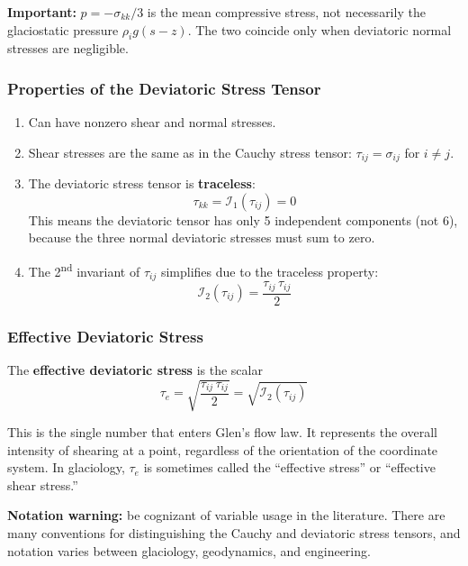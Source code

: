 \documentclass[11pt]{article}
\begin{document}
\textbf{Important:} $p = -\sigma_{kk}/3$ is the mean compressive stress, not necessarily the glaciostatic pressure $\rho_i g (s-z)$.  The two coincide only when deviatoric normal stresses are negligible.

\subsubsection*{Properties of the Deviatoric Stress Tensor}

\begin{enumerate}
  \item Can have nonzero shear and normal stresses.
  \item Shear stresses are the same as in the Cauchy stress tensor: $\tau_{ij} = \sigma_{ij}$ for $i \neq j$.
  \item The deviatoric stress tensor is \textbf{traceless}:
    \begin{equation}
      \tau_{kk} = \mathcal{I}_1(\tau_{ij}) = 0
    \end{equation}
    This means the deviatoric tensor has only 5 independent components (not 6), because the three normal deviatoric stresses must sum to zero.
  \item The 2\textsuperscript{nd} invariant of $\tau_{ij}$ simplifies due to the traceless property:
    \begin{equation}
      \mathcal{I}_2(\tau_{ij}) = \frac{\tau_{ij}\,\tau_{ij}}{2}
    \end{equation}
\end{enumerate}

\subsubsection*{Effective Deviatoric Stress}

The \textbf{effective deviatoric stress} is the scalar
\begin{equation}
  \tau_e = \sqrt{\frac{\tau_{ij}\,\tau_{ij}}{2}} = \sqrt{\mathcal{I}_2(\tau_{ij})}
\end{equation}

This is the single number that enters Glen's flow law.  It represents the overall intensity of shearing at a point, regardless of the orientation of the coordinate system.  In glaciology, $\tau_e$ is sometimes called the ``effective stress'' or ``effective shear stress.''

\medskip
\noindent \textbf{Notation warning:} be cognizant of variable usage in the literature.  There are many conventions for distinguishing the Cauchy and deviatoric stress tensors, and notation varies between glaciology, geodynamics, and engineering.
\end{document}
